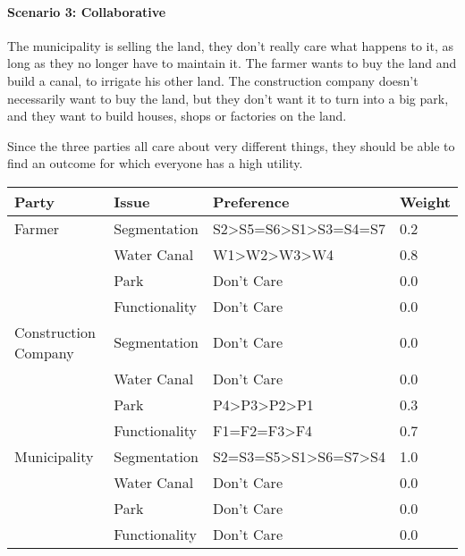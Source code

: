 \documentclass[a4,11pt]{scrartcl}
\begin{document}
    \paragraph{Scenario 3: Collaborative}
    
    The municipality is selling the land, they don't really care what
    happens to it, as long as they no longer have to maintain it. The
    farmer wants to buy the land and build a canal, to irrigate his
    other land. The construction company doesn't necessarily want to
    buy the land, but they don't want it to turn into a big park, and
    they want to build houses, shops or factories on the land.
    
    Since the three parties all care about very different things, they
    should be able to find an outcome for which everyone has a high
    utility.
    
    \begin{center}
    \begin{tabular}{|l|l|l|l|}
        \hline{}
        {\bf Party}&{\bf Issue}&{\bf Preference}&{\bf Weight}\\
        \hline\hline
        Farmer & Segmentation & S2\textgreater S5=S6\textgreater S1\textgreater S3=S4=S7 & 0.2\\
        \cline{2-4}&Water Canal & W1\textgreater W2\textgreater W3\textgreater W4 &0.8\\
        \cline{2-4}&Park& Don't Care & 0.0\\
        \cline{2-4}&Functionality& Don't Care & 0.0\\
        \hline\hline{}
        Construction Company & Segmentation & Don't Care & 0.0\\
        \cline{2-4}&Water Canal & Don't Care &0.0\\
        \cline{2-4}&Park& P4\textgreater P3\textgreater P2\textgreater P1 & 0.3\\
        \cline{2-4}&Functionality& F1=F2=F3\textgreater F4 & 0.7\\
        \hline\hline{}
        Municipality & Segmentation & S2=S3=S5\textgreater S1\textgreater S6=S7\textgreater S4 & 1.0\\
        \cline{2-4}&Water Canal & Don't Care &0.0\\
        \cline{2-4}&Park& Don't Care & 0.0\\
        \cline{2-4}&Functionality& Don't Care & 0.0\\
        \hline
    \end{tabular}
    \end{center}
    
\end{document}

